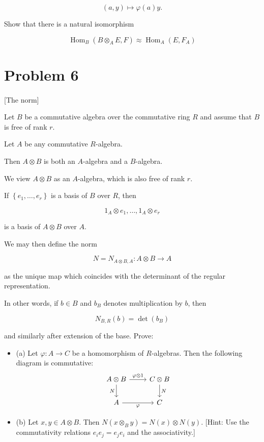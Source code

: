 \documentclass{article}
\begin{document}
$$
(a, y) \mapsto \varphi(a) y .
$$

Show that there is a natural isomorphism

$$
\operatorname{Hom}_B\left(B \otimes_A E, F\right) \approx \operatorname{Hom}_A\left(E, F_A\right)
$$

\section*{Problem 6}\paragraph{}
[The norm]

Let $B$ be a commutative algebra over the commutative ring $R$ and assume that $B$ is free of rank $r$.

Let $A$ be any commutative $R$-algebra.

Then $A \otimes B$ is both an $A$-algebra and a $B$-algebra.

We view $A \otimes B$ as an $A$-algebra, which is also free of rank $r$.

If $\left\{e_1, \ldots, e_r\right\}$ is a basis of $B$ over $R$, then

$$
1_A \otimes e_1, \ldots, 1_A \otimes e_r
$$

is a basis of $A \otimes B$ over $A$.

We may then define the norm

$$
N=N_{A \otimes B, A}: A \otimes B \rightarrow A
$$

as the unique map which coincides with the determinant of the regular representation.

In other words, if $b \in B$ and $b_B$ denotes multiplication by $b$, then

$$
N_{B, R}(b)=\operatorname{det}\left(b_B\right)
$$

and similarly after extension of the base. Prove:

\begin{itemize}
    \item (a) Let $\varphi: A \rightarrow C$ be a homomorphism of $R$-algebras. Then the following diagram is commutative:
\[\begin{tikzcd}
	{A\otimes{B}} & {C\otimes{B}} \\
	A & C
	\arrow["\varphi\otimes1", from=1-1, to=1-2]
	\arrow["N", from=1-2, to=2-2]
	\arrow["N"', from=1-1, to=2-1]
	\arrow["\varphi"', from=2-1, to=2-2]
\end{tikzcd}\]
    \item (b) Let $x, y \in A \otimes B$. Then $N\left(x \otimes_B y\right)=N(x) \otimes N(y)$. [Hint: Use the commutativity relations $e_i e_j=e_j e_i$ and the associativity.]
\end{itemize}
\end{document}

